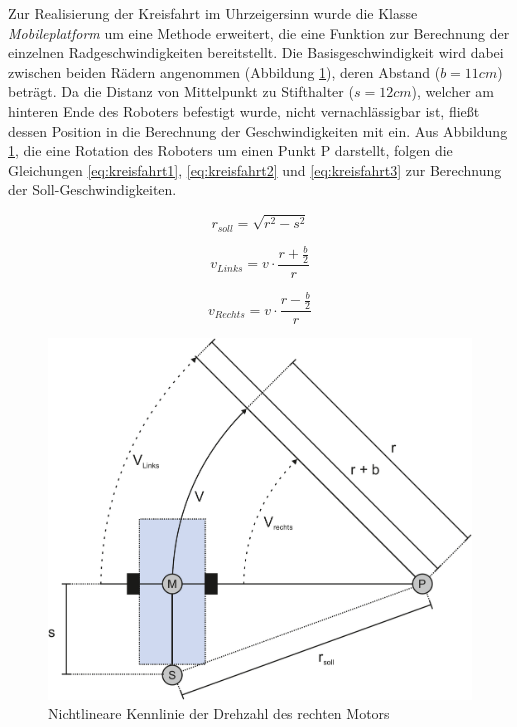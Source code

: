\documentclass[12pt,a4paper,oneside]{article}
\begin{document}
\begin{spacing}{1.15}
\newpage
Zur Realisierung der Kreisfahrt im Uhrzeigersinn wurde die Klasse \textit{Mobileplatform} um eine Methode erweitert, die eine Funktion zur Berechnung der einzelnen Radgeschwindigkeiten bereitstellt. Die Basisgeschwindigkeit wird dabei zwischen beiden Rädern angenommen (Abbildung \ref{fig:kreisfahrt}), deren Abstand ($b=11cm$) beträgt. Da die Distanz von Mittelpunkt zu Stifthalter ($s = 12 cm$), welcher am hinteren Ende des Roboters befestigt wurde, nicht vernachlässigbar ist, fließt dessen Position in die Berechnung der Geschwindigkeiten mit ein. Aus Abbildung \ref{fig:kreisfahrt}, die eine Rotation des Roboters um einen Punkt P darstellt, folgen die Gleichungen \ref{eq:kreisfahrt1}, \ref{eq:kreisfahrt2} und \ref{eq:kreisfahrt3} zur Berechnung der Soll-Geschwindigkeiten.

\begin{center}
	\begin{equation}
		r_{soll} = \sqrt{r^2-s^2}
	\label{eq:kreisfahrt1}
	\end{equation}
\end{center} 

\begin{center}
	\begin{equation}
	v_{Links} = v \cdot \frac{r + \frac{b}{2}}{r}
	\label{eq:kreisfahrt2}
	\end{equation}
\end{center} 

\begin{center}
	\begin{equation}
	v_{Rechts} = v \cdot \frac{r - \frac{b}{2}}{r}
	\label{eq:kreisfahrt3}
	\end{equation}
\end{center}


\begin{figure}[!htb]
	\centering
	\includegraphics[scale=.4]{figs/Kreisfahrt}
	\caption{Nichtlineare Kennlinie der Drehzahl des rechten Motors}
	\label{fig:kreisfahrt}
\end{figure}



\end{spacing}
\end{document}
